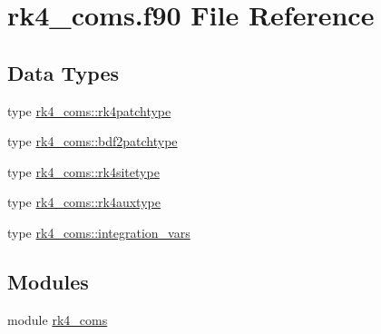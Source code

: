 \hypertarget{rk4__coms_8f90}{}\section{rk4\+\_\+coms.\+f90 File Reference}
\label{rk4__coms_8f90}
\subsection*{Data Types}
\begin{DoxyCompactItemize}
\item 
type \hyperlink{structrk4__coms_1_1rk4patchtype}{rk4\+\_\+coms\+::rk4patchtype}
\item 
type \hyperlink{structrk4__coms_1_1bdf2patchtype}{rk4\+\_\+coms\+::bdf2patchtype}
\item 
type \hyperlink{structrk4__coms_1_1rk4sitetype}{rk4\+\_\+coms\+::rk4sitetype}
\item 
type \hyperlink{structrk4__coms_1_1rk4auxtype}{rk4\+\_\+coms\+::rk4auxtype}
\item 
type \hyperlink{structrk4__coms_1_1integration__vars}{rk4\+\_\+coms\+::integration\+\_\+vars}
\end{DoxyCompactItemize}
\subsection*{Modules}
\begin{DoxyCompactItemize}
\item 
module \hyperlink{namespacerk4__coms}{rk4\+\_\+coms}
\end{DoxyCompactItemize}

